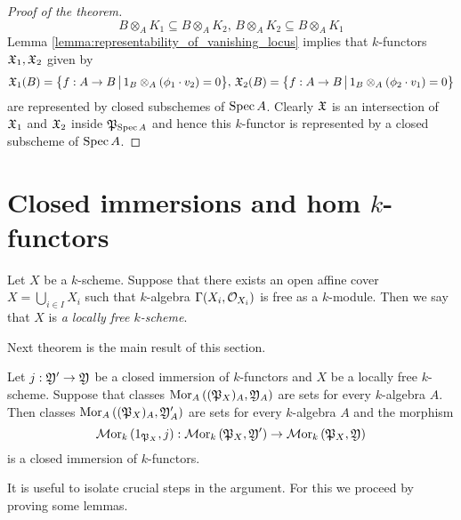 \begin{proof}[Proof of the theorem]
$$B\otimes_AK_1 \subseteq B\otimes_AK_2,\,B\otimes_AK_2\subseteq B\otimes_AK_1$$
Lemma \ref{lemma:representability_of_vanishing_locus} implies that $k$-functors ${\mathfrak X}_1,{\mathfrak X}_2$ given by
$${\mathfrak X}_1(B) = \big\{f:A\rightarrow B\,\big|\,1_B\otimes_A\left(\phi_1\cdot v_2\right) = 0\big\},\,{\mathfrak X}_2(B) =  \big\{f:A\rightarrow B\,\big|\,1_B\otimes_A\left(\phi_2\cdot v_1\right) = 0\big\}$$
are represented by closed subschemes of $\mathrm{Spec}\, A$. Clearly ${\mathfrak X}$ is an intersection of ${\mathfrak X}_1$ and ${\mathfrak X}_2$ inside ${\mathfrak P}_{\mathrm{Spec}\, A}$ and hence this $k$-functor is represented by a closed subscheme of $\mathrm{Spec}\, A$.
\end{proof}

\section{Closed immersions and hom $k$-functors}

\begin{definition}
Let $X$ be a $k$-scheme. Suppose that there exists an open affine cover $X = \bigcup_{i\in I}X_i$ such that $k$-algebra $\Gamma(X_i,{\mathcal O}_{X_i})$ is free as a $k$-module. Then we say that $X$ is \textit{a locally free $k$-scheme}.
\end{definition}
\noindent
Next theorem is the main result of this section.

\begin{theorem}\label{theorem:closed_immersions_and_internal_hom}
Let $j:{\mathfrak Y}'\rightarrow {\mathfrak Y}$ be a closed immersion of $k$-functors and $X$ be a locally free $k$-scheme. Suppose that classes $\mathrm{Mor}_A\left(({\mathfrak P}_X)_A,{\mathfrak Y}_A\right)$ are sets for every $k$-algebra $A$. Then classes $\mathrm{Mor}_A\left(({\mathfrak P}_X)_A,{\mathfrak Y}'_A\right)$ are sets for every $k$-algebra $A$ and the morphism
$$\mathcal{M}\mathrm{or}_k\left(1_{{\mathfrak P}_X},j\right):\mathcal{M}\mathrm{or}_k\left({\mathfrak P}_X,{\mathfrak Y}'\right)\rightarrow \mathcal{M}\mathrm{or}_k\left({\mathfrak P}_X,{\mathfrak Y}\right)$$
is a closed immersion of $k$-functors.
\end{theorem}
\noindent
It is useful to isolate crucial steps in the argument. For this we proceed by proving some lemmas.

